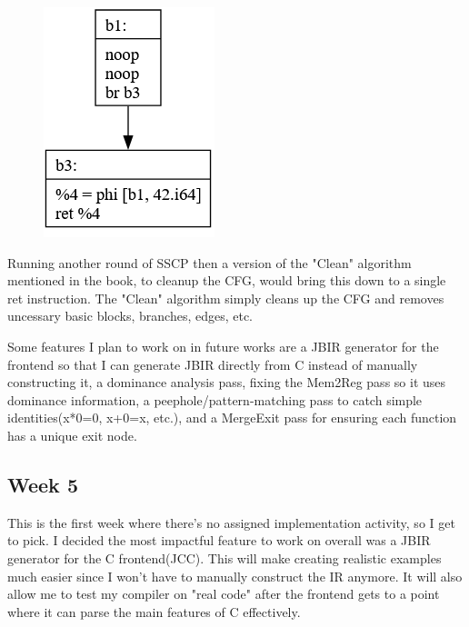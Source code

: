 \documentclass[11pt, a4paper, titlepage]{article}
\begin{document}
\begin{figure}[H]
  \centering
  \includegraphics[scale=0.3]{images/i13.png}
\end{figure}

Running another round of SSCP then a version of the "Clean" algorithm mentioned in the book, to cleanup the CFG, would bring this down to a single ret instruction. The "Clean" algorithm simply cleans up the CFG and removes uncessary basic blocks, branches, edges, etc.

Some features I plan to work on in future works are a JBIR generator for the frontend so that I can generate JBIR directly from C instead of manually constructing it, a dominance analysis pass, fixing the Mem2Reg pass so it uses dominance information, a peephole/pattern-matching pass to catch simple identities(x*0=0, x+0=x, etc.), and a MergeExit pass for ensuring each function has a unique exit node.

\subsection{Week 5}

This is the first week where there's no assigned implementation activity, so I get to pick. I decided the most impactful feature to work on overall was a JBIR generator for the C frontend(JCC). This will make creating realistic examples much easier since I won't have to manually construct the IR anymore. It will also allow me to test my compiler on "real code" after the frontend gets to a point where it can parse the main features of C effectively.
\end{document}
